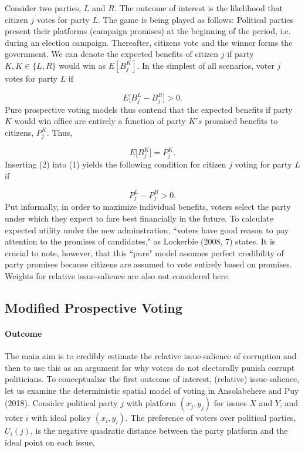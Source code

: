 \documentclass[11pt]{article}
\begin{document}
Consider two parties, $L$ and $R$. The outcome of interest is the likelihood that citizen $j$ votes for party $L$. The game is being played as follows: Political parties present their platforms (campaign promises) at the beginning of the period, i.e. during an election campaign. Thereafter, citizens vote and the winner forms the government. We can denote the expected benefits of citizen $j$ if party $K, K \in \{L, R\}$ would win as $E[B_j^K]$. In the simplest of all scenarios, voter $j$ votes for party $L$ if

\begin{equation}
E\bigg[B_j^L - B_j^R\bigg] > 0.
\end{equation}
Pure prospective voting models thus contend that the expected benefits if party $K$ would win office are entirely a function of party $K's$ promised benefits to citizens, $P_j^K$. Thus,

\begin{equation}
E\bigg[B_j^K\bigg] = P_j^K.
\end{equation}
Inserting (2) into (1) yields the following condition for citizen $j$ voting for party $L$ if

\begin{equation}
P_j^L - P_j^R > 0.
\end{equation}
Put informally, in order to maximize individual benefits, voters select the party under which they expect to fare best financially in the future. To calculate expected utility under the new adminstration, “voters have good reason to pay attention to the promises of candidates," as Lockerbie (2008, 7) states. It is crucial to note, however, that this “pure" model assumes perfect credibility of party promises because citizens are assumed to vote entirely based on promises. Weights for relative issue-salience are also not considered here.

\subsection{Modified Prospective Voting}
\paragraph{Outcome}
The main aim is to credibly estimate the relative issue-salience of corruption and then to use this as an argument for why voters do not electorally punish corrupt politicians. To conceptualize the first outcome of interest, (relative) issue-salience, let us examine the deterministic spatial model of voting in Ansolabehere and Puy (2018). Consider political party $j$ with platform $(x_j, y_j)$ for issues $X$ and $Y$, and voter $i$ with ideal policy $(x_i, y_i)$. The preference of voters over political parties, $U_i(j)$, is the negative quadratic distance between the party platform and the ideal point on each issue,
\end{document}

